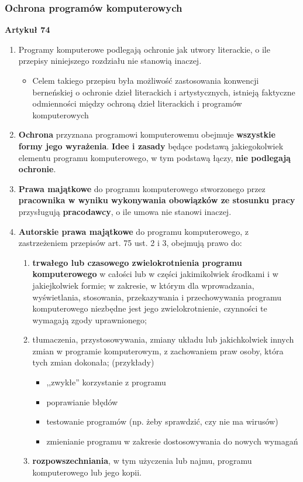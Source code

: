 \documentclass[12pt,a4paper]{article}
\begin{document}
\subsubsection{Ochrona programów komputerowych} \label{ochronapr}
\textbf{Artykuł 74}
\begin{enumerate}
\item Programy komputerowe podlegają ochronie jak utwory literackie, o ile przepisy niniejszego rozdziału nie stanowią inaczej.
	\begin{itemize}
		\item Celem takiego przepisu była możliwość zastosowania konwencji berneńskiej o ochronie dzieł literackich i artystycznych, istnieją faktyczne odmienności między ochroną dzieł literackich i programów komputerowych
	\end{itemize}
\item \textbf{Ochrona} przyznana programowi komputerowemu obejmuje \textbf{wszystkie formy jego wyrażenia}. \textbf{Idee i zasady} będące podstawą jakiegokolwiek elementu programu komputerowego, w tym podstawą łączy, \textbf{nie podlegają ochronie}.
\item \textbf{Prawa majątkowe} do programu komputerowego stworzonego przez \textbf{pracownika w wyniku wykonywania obowiązków ze stosunku pracy} przysługują \textbf{pracodawcy}, o ile umowa nie stanowi inaczej. \label{utworprac} 
\item \textbf{Autorskie prawa majątkowe} do programu komputerowego, z zastrzeżeniem przepisów art. 75 ust. 2 i 3, obejmują prawo do:
	\begin{enumerate}[1.]
		\item \textbf{trwałego lub czasowego zwielokrotnienia programu komputerowego} w całości lub w części jakimikolwiek środkami i w jakiejkolwiek formie; w zakresie, w którym dla wprowadzania, wyświetlania, stosowania, przekazywania i przechowywania programu komputerowego niezbędne jest jego zwielokrotnienie, czynności te wymagają zgody uprawnionego;
		\item tłumaczenia, przystosowywania, zmiany układu lub jakichkolwiek innych zmian w programie komputerowym, z zachowaniem praw osoby, która tych zmian dokonała; (przykłady)
			\begin{itemize}
			 	\item  ,,zwykłe'' korzystanie z programu
				\item poprawianie błędów
				\item testowanie programów (np. żeby sprawdzić, czy nie ma wirusów)
				\item zmienianie programu w zakresie dostosowywania do nowych wymagań
			\end{itemize}
		\item \textbf{rozpowszechniania}, w tym użyczenia lub najmu, programu komputerowego lub jego kopii.
	\end{enumerate}
\end{enumerate}
\end{document}
